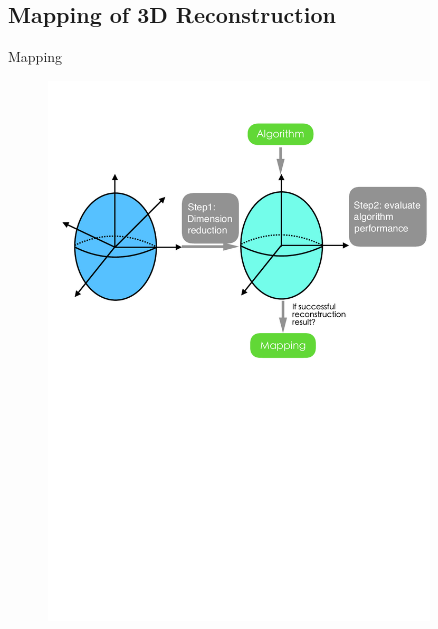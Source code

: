 \documentclass[10pt]{beamer}
\begin{document}
\subsection{Mapping of 3D Reconstruction}
\begin{frame}{Mapping}


\begin{figure}
\centering
\includegraphics[width=0.9\textwidth]{images/mapping_3d_vision.pdf}
\end{figure}


\end{frame}
\end{document}
